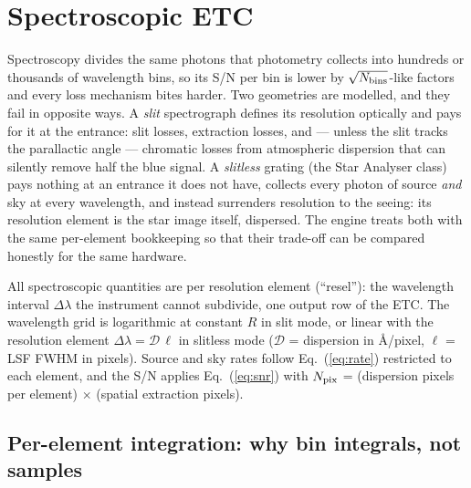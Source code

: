 \section{Spectroscopic ETC}
\label{sec:spectroscopy}

Spectroscopy divides the same photons that photometry collects into
hundreds or thousands of wavelength bins, so its S/N per bin is lower by
$\sqrt{N_{\rm bins}}$-like factors and every loss mechanism bites harder.
Two geometries are modelled, and they fail in opposite ways. A
\emph{slit} spectrograph defines its resolution optically and pays for it
at the entrance: slit losses, extraction losses, and --- unless the slit
tracks the parallactic angle --- chromatic losses from atmospheric
dispersion that can silently remove half the blue signal. A
\emph{slitless} grating (the Star Analyser class) pays nothing at an
entrance it does not have, collects every photon of source \emph{and}
sky at every wavelength, and instead surrenders resolution to the
seeing: its resolution element is the star image itself, dispersed. The
engine treats both with the same per-element bookkeeping so that their
trade-off can be compared honestly for the same hardware.

All spectroscopic quantities are per resolution element (``resel''): the
wavelength interval $\Delta\lambda$ the instrument cannot subdivide, one
output row of the ETC. The wavelength grid
is logarithmic at constant $R$ in slit mode, or linear with the resolution
element $\Delta\lambda = \mathcal{D}\,\ell$ in slitless mode
($\mathcal{D}$ = dispersion in \si{\angstrom}/pixel, $\ell$ = LSF FWHM in
pixels). Source and sky rates follow Eq.~(\ref{eq:rate}) restricted to each
element, and the S/N applies Eq.~(\ref{eq:snr}) with
$N_{\rm pix}$ = (dispersion pixels per element) $\times$ (spatial extraction
pixels).

\subsection{Per-element integration: why bin integrals, not samples}
\label{sec:binint}

